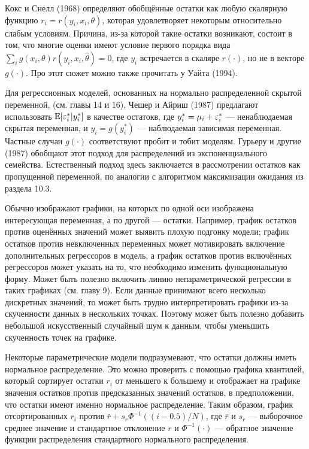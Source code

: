 Кокс и Снелл (1968) определяют обобщённые остатки как любую скалярную функцию $r_i = r(y_i, x_i, \theta)$, которая удовлетворяет некоторым относительно слабым условиям. Причина, из-за которой такие остатки возникают, состоит в том, что многие оценки имеют условие первого порядка вида $\sum_i g(x_i, \theta)r(y_i, x_i, \hat{\theta}) = 0$, где $y_i$ встречается в скаляре $r(\cdot)$, но не в векторе $g(\cdot)$. Про этот сюжет можно также прочитать у Уайта (1994).

Для регрессионных моделей, основанных на нормально распределенной скрытой переменной, (см. главы 14 и 16), Чешер и Айриш (1987) предлагают использовать $\mathbb{E}[\varepsilon_i^*|y_i^*]$ в качестве остатокв, где $y_i^* = \mu_i + \varepsilon_i^*$ --- ненаблюдаемая скрытая переменная, и $y_i = g(y_i^*)$ --- наблюдаемая зависимая переменная. Частные случаи $g(\cdot)$ соответствуют пробит и тобит моделям. Гурьеру и другие (1987) обобщают этот подход для распределений из экспоненциального семейства. Естественный подход здесь заключается в рассмотрении  остатков как пропущенной переменной, по аналогии с  алгоритмом максимизации ожидания из раздела 10.3.

Обычно изображают графики, на которых по одной оси изображена интересующая переменная, а по другой --- остатки. Например, график остатков против оценённых значений может выявить плохую подгонку модели; график остатков против невключенных переменных может мотивировать включение дополнительных регрессоров в модель, а график остатков против включённых регрессоров может указать на то, что необходимо изменить функциональную форму. Может быть полезно включить линию непараметрической регрессии в таких графиках (см. главу 9). Если данные принимают всего несколько дискретных значений, то может быть трудно интерпретировать графики из-за скученности данных в нескольких точках. Поэтому может быть полезно добавить небольшой искусственный случайный шум к данным, чтобы уменьшить скученность точек на графике.

Некоторые параметрические модели подразумевают, что  остатки должны иметь нормальное распределение. Это можно проверить с помощью графика квантилей, который сортирует остатки $r_i$ от меньшего к большему и отображает на графике значения остатков против предсказанных значений остатков, в предположении, что остатки имеют именно нормальное распределение. Таким образом, график отсортированных $r_i$ против $\bar{r} + s_r\Phi^{-1}((i - 0.5)/N)$, где $\bar{r}$ и $s_r$ --- выборочное среднее значение и стандартное отклонение $r$ и $\Phi^{-1}(\cdot)$ --- обратное значение функции распределения стандартного нормального распределения.

